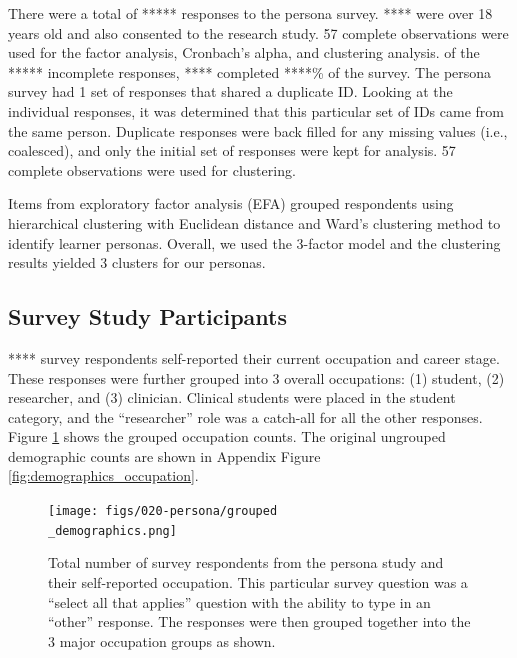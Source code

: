\documentclass[020-persona\_validation.tex]{subfiles}
\begin{document}
    There were a total of ***** responses to the persona survey.
    **** were over 18 years old and also consented to the research study.
    57 complete observations %
    were used for the factor analysis, Cronbach's alpha, and clustering analysis.
    of the ***** incomplete responses,
    **** completed ****\% of the survey.
    The persona survey had 1 set of responses %
    that shared a duplicate ID.
    Looking at the individual responses,
    it was determined that this particular set of IDs came from the same person.
    Duplicate responses were back filled for any missing values (i.e., coalesced),
    and only the initial set of responses were kept for analysis.
    57 complete observations %
    were used for clustering.

    Items from exploratory factor analysis (EFA) grouped respondents
    using hierarchical clustering with Euclidean distance and Ward's clustering method
    to identify learner personas.
    Overall,
    we used the 3-factor model and the clustering results yielded 3 clusters for our personas.

    \subsection{Survey Study Participants}

        **** survey respondents self-reported their current occupation and career stage.
        These responses were further grouped into 3 overall occupations:
        (1) student,
        (2) researcher, and
        (3) clinician.
        Clinical students were placed in the student category,
        and the ``researcher'' role was a catch-all for all the other responses.
        Figure \ref{fig:groupeddemographics} shows the grouped occupation counts.
        The original ungrouped demographic counts are shown in Appendix Figure \ref{fig:demographics_occupation}.

        \begin{figure}[htb]
            \centering
            \texttt{[image: figs/020-persona/grouped\\\_demographics.png]}
            \caption[Grouped demographics for persona survey respondents]{
            Total number of survey respondents from the persona study and their self-reported occupation.
                This particular survey question was a ``select all that applies''
                question with the ability to type in an ``other'' response.
                The responses were then grouped together into the 3 major occupation groups as shown.}
            \label{fig:groupeddemographics}
        \end{figure}
\end{document}
